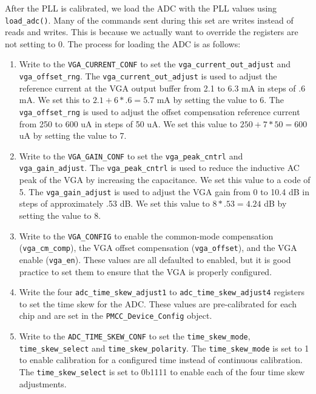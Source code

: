 After the PLL is calibrated, we load the ADC with the PLL values using \texttt{load\_adc()}.
Many of the commands sent during this set are writes instead of reads and writes.
This is because we actually want to override the registers are not setting to 0.
The process for loading the ADC is as follows:
\begin{enumerate}
    \item 
        Write to the \texttt{VGA\_CURRENT\_CONF} to set the \texttt{vga\_current\_out\_adjust} and \texttt{vga\_offset\_rng}.
        The \texttt{vga\_current\_out\_adjust} is used to adjust the reference current at the VGA output buffer from 2.1 to 6.3 mA in steps of .6 mA.
        We set this to $2.1 + 6 * .6 = 5.7$ mA by setting the value to 6.
        The \texttt{vga\_offset\_rng} is used to adjust the offset compensation reference current from 250 to 600 uA in steps of 50 uA.
        We set this value to $250 + 7 * 50 = 600$ uA by setting the value to 7.
    \item 
        Write to the \texttt{VGA\_GAIN\_CONF} to set the \texttt{vga\_peak\_cntrl} and \texttt{vga\_gain\_adjust}.
        The \texttt{vga\_peak\_cntrl} is used to reduce the inductive AC peak of the VGA by increasing the capacitance.
        We set this value to a code of 5.
        The \texttt{vga\_gain\_adjust} is used to adjust the VGA gain from 0 to 10.4 dB in steps of approximately .53 dB.
        We set this value to $8 * .53 = 4.24$ dB by setting the value to 8.
    \item 
        Write to the \texttt{VGA\_CONFIG} to enable the common-mode compensation (\texttt{vga\_cm\_comp}), the VGA offset compensation (\texttt{vga\_offset}), and the VGA enable (\texttt{vga\_en}).
        These values are all defaulted to enabled, but it is good practice to set them to ensure that the VGA is properly configured.
    \item 
        Write the four \texttt{adc\_time\_skew\_adjust1} to \texttt{adc\_time\_skew\_adjust4} registers to set the time skew for the ADC.
        These values are pre-calibrated for each chip and are set in the \texttt{PMCC\_Device\_Config} object.
    \item 
        Write to the \texttt{ADC\_TIME\_SKEW\_CONF} to set the \texttt{time\_skew\_mode}, \linebreak \texttt{time\_skew\_select} and \texttt{time\_skew\_polarity}.
        The \texttt{time\_skew\_mode} is set to 1 to enable calibration for a configured time instead of continuous calibration.
        The \texttt{time\_skew\_select} is set to 0b1111 to enable each of the four time skew adjustments.

\end{enumerate}
